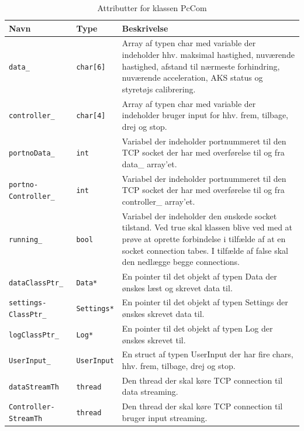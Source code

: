 \begin{table}[h]
\begin{tabularx}{\textwidth}{| Z | Z | L{10cm} |} \hline
Navn & Type & Beskrivelse \\\hline
\texttt{data\_}					& \texttt{char[6]}	&Array af typen char med variable der indeholder hhv. maksimal hastighed, nuværende hastighed, afstand til nærmeste forhindring, nuværende acceleration, AKS status og styretøjs calibrering.\\\hline

\texttt{controller\_}			& \texttt{char[4]}	&Array af typen char med variable der indeholder bruger input for hhv. frem, tilbage, drej og stop.\\\hline

\texttt{portnoData\_}			& \texttt{int}		&Variabel der indeholder portnummeret til den TCP socket der har med overførelse til og fra data\_ array'et.\\\hline

\texttt{portno- Controller\_}	& \texttt{int}		&Variabel der indeholder portnummeret til den TCP socket der har med overførelse til og fra controller\_ array'et.\\\hline

\texttt{running\_}				& \texttt{bool}		&Variabel der indeholder den ønskede socket tilstand. Ved true skal klassen blive ved med at prøve at oprette forbindelse i tilfælde af at en socket connection tabes. I tilfælde af false skal den nedlægge begge connections.\\\hline

\texttt{dataClassPtr\_}			& \texttt{Data*}	&En pointer til det objekt af typen Data der ønskes læst og skrevet data til.\\\hline

\texttt{settings- ClassPtr\_}	& \texttt{Settings*}&En pointer til det objekt af typen Settings der ønskes skrevet data til.\\\hline

\texttt{logClassPtr\_}			& \texttt{Log*}		&En pointer til det objekt af typen Log der ønskes skrevet til.\\\hline

\texttt{UserInput\_}			& \texttt{UserInput}&En struct af typen UserInput der har fire chars, hhv. frem, tilbage, drej og stop.\\\hline

\texttt{dataStreamTh}			& \texttt{thread}	&Den thread der skal køre TCP connection til data streaming.\\\hline

\texttt{Controller- StreamTh}	& \texttt{thread}	&Den thread der skal køre TCP connection til bruger input streaming.\\\hline
\end{tabularx}
\caption{Attributter for klassen PcCom}
\label{table:attr_pccom}
\end{table}

